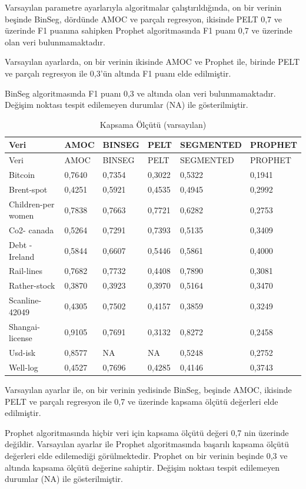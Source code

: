 \documentclass[12pt,twoside]{deuthesis}
\begin{document}
Varsayılan parametre ayarlarıyla algoritmalar çalıştırıldığında, on bir verinin beşinde BinSeg, dördünde AMOC ve parçalı regresyon, ikisinde PELT 0,7 ve üzerinde F1 puanına sahipken Prophet algoritmasında F1 puanı 0,7 ve üzerinde olan veri bulunmamaktadır.

Varsayılan ayarlarda, on bir verinin ikisinde AMOC ve Prophet ile, birinde PELT ve parçalı regresyon ile 0,3'ün altında F1 puanı elde edilmiştir.

BinSeg algoritmasında F1 puanı 0,3 ve altında olan veri bulunmamaktadır.
Değişim noktası tespit edilemeyen durumlar (NA) ile gösterilmiştir.

\begin{longtable}[]{@{}llllll@{}}
\caption{\label{tab:nvar3} Kapsama Ölçütü (varsayılan)}\tabularnewline
\toprule\noalign{}
Veri & AMOC & BINSEG & PELT & SEGMENTED & PROPHET \\
\midrule\noalign{}
\endfirsthead
\toprule\noalign{}
Veri & AMOC & BINSEG & PELT & SEGMENTED & PROPHET \\
\midrule\noalign{}
\endhead
\bottomrule\noalign{}
\endlastfoot
Bitcoin & 0,7640 & 0,7354 & 0,3022 & 0,5322 & 0,1941 \\
Brent-spot & 0,4251 & 0,5921 & 0,4535 & 0,4945 & 0,2992 \\
Children-per women & 0,7838 & 0,7663 & 0,7721 & 0,6282 & 0,2753 \\
Co2- canada & 0,5264 & 0,7291 & 0,7393 & 0,5135 & 0,3409 \\
Debt -Ireland & 0,5844 & 0,6607 & 0,5446 & 0,5861 & 0,4000 \\
Rail-lines & 0,7682 & 0,7732 & 0,4408 & 0,7890 & 0,3081 \\
Rather-stock & 0,3870 & 0,3923 & 0,3970 & 0,5164 & 0,3470 \\
Scanline-42049 & 0,4305 & 0,7502 & 0,4157 & 0,3859 & 0,3249 \\
Shangai-license & 0,9105 & 0,7691 & 0,3132 & 0,8272 & 0,2458 \\
Usd-isk & 0,8577 & NA & NA & 0,5248 & 0,2752 \\
Well-log & 0,4527 & 0,7696 & 0,4285 & 0,4146 & 0,3743 \\
\end{longtable}

Varsayılan ayarlar ile, on bir verinin yedisinde BinSeg, beşinde AMOC, ikisinde PELT ve parçalı regresyon ile 0,7 ve üzerinde kapsama ölçütü değerleri elde edilmiştir.

Prophet algoritmasında hiçbir veri için kapsama ölçütü değeri 0,7 nin üzerinde değildir.
Varsayılan ayarlar ile Prophet algoritmasında başarılı kapsama ölçütü değerleri elde edilemediği görülmektedir. Prophet on bir verinin beşinde 0,3 ve altında kapsama ölçütü değerine sahiptir.
Değişim noktası tespit edilemeyen durumlar (NA) ile gösterilmiştir.
\end{document}
